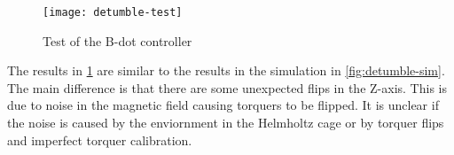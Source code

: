 \begin{figure}[!ht]
    \centering
    \texttt{[image: detumble-test]}
  \caption{Test of the B-dot controller}
    \label{fig:detumble-test}
\end{figure}

The results in \cref{fig:detumble-test} are similar to the results in the simulation in \cref{fig:detumble-sim}. The main difference is that there are some unexpected flips in the Z-axis. This is due to noise in the magnetic field causing torquers to be flipped. It is unclear if the noise is caused by the enviornment in the Helmholtz cage or by torquer flips and imperfect torquer calibration.


